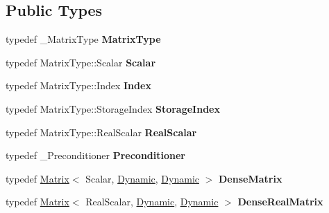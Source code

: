 \subsection*{Public Types}
\begin{DoxyCompactItemize}
\item 
\mbox{\label{class_eigen_1_1_d_g_m_r_e_s_abebf2c0dc490d410fbf5f24dedc60712}} 
typedef \+\_\+\+Matrix\+Type {\bfseries Matrix\+Type}
\item 
\mbox{\label{class_eigen_1_1_d_g_m_r_e_s_aa2172314b09dbddeb3661ca9c809b371}} 
typedef Matrix\+Type\+::\+Scalar {\bfseries Scalar}
\item 
\mbox{\label{class_eigen_1_1_d_g_m_r_e_s_a8f6716ac7b42e0c4879c6fec42fe0193}} 
typedef Matrix\+Type\+::\+Index {\bfseries Index}
\item 
\mbox{\label{class_eigen_1_1_d_g_m_r_e_s_a5e96d9b5ca6098272003550ef87c32d2}} 
typedef Matrix\+Type\+::\+Storage\+Index {\bfseries Storage\+Index}
\item 
\mbox{\label{class_eigen_1_1_d_g_m_r_e_s_a7e47d437b590be8af0e9972e60adbe34}} 
typedef Matrix\+Type\+::\+Real\+Scalar {\bfseries Real\+Scalar}
\item 
\mbox{\label{class_eigen_1_1_d_g_m_r_e_s_acae98b6f30d350a136ed4bc3a270834b}} 
typedef \+\_\+\+Preconditioner {\bfseries Preconditioner}
\item 
\mbox{\label{class_eigen_1_1_d_g_m_r_e_s_a87d1411656955d8c3f053cfc2be4a856}} 
typedef \hyperlink{group___core___module_class_eigen_1_1_matrix}{Matrix}$<$ Scalar, \hyperlink{namespace_eigen_ad81fa7195215a0ce30017dfac309f0b2}{Dynamic}, \hyperlink{namespace_eigen_ad81fa7195215a0ce30017dfac309f0b2}{Dynamic} $>$ {\bfseries Dense\+Matrix}
\item 
\mbox{\label{class_eigen_1_1_d_g_m_r_e_s_a4c15bd34c5956f8b78020dc5c0d2e667}} 
typedef \hyperlink{group___core___module_class_eigen_1_1_matrix}{Matrix}$<$ Real\+Scalar, \hyperlink{namespace_eigen_ad81fa7195215a0ce30017dfac309f0b2}{Dynamic}, \hyperlink{namespace_eigen_ad81fa7195215a0ce30017dfac309f0b2}{Dynamic} $>$ {\bfseries Dense\+Real\+Matrix}

\end{DoxyCompactItemize}
